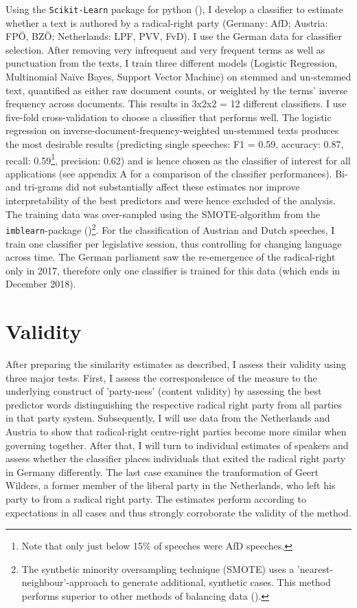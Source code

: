 \documentclass{article}
\begin{document}
Using the \texttt{Scikit-Learn} package for python (\cite{Pedregosa2011}), I develop a classifier to estimate whether a text is authored by a radical-right party (Germany: AfD; Austria: FPÖ, BZÖ; Netherlands: LPF, PVV, FvD). I use the German data for classifier selection. After removing very infrequent and very frequent terms as well as punctuation from the texts, I train three different models (Logistic Regression, Multinomial Naïve Bayes, Support Vector Machine) on stemmed and un-stemmed text, quantified as either raw document counts, or weighted by the terms' inverse frequency across documents. This results in 3x2x2 = 12 different classifiers. I use five-fold cross-validation to choose a classifier that performs well. The logistic regression on inverse-document-frequency-weighted un-stemmed texts produces the most desirable results (predicting single speeches: F1 = 0.59, accuracy: 0.87, recall: 0.59\footnote{Note that only just below 15\% of speeches were AfD speeches.}, precision: 0.62) and is hence chosen as the classifier of interest for all applications (see appendix A for a comparison of the classifier performances). Bi- and tri-grams did not substantially affect these estimates nor improve interpretability of the best predictors and were hence excluded of the analysis. The training data was over-sampled using the SMOTE-algorithm from the \texttt{imblearn}-package (\cite{Lemaitre2017})\footnote{The synthetic minority oversampling technique (SMOTE) uses a 'nearest-neighbour'-approach to generate additional, synthetic cases. This method performs superior to other methods of balancing data (\cite{Chawla2002}).}. For the classification of Austrian and Dutch speeches, I train one classifier per legislative session, thus controlling for changing language across time. The German parliament saw the re-emergence of the radical-right only in 2017, therefore only one classifier is trained for this data (which ends in December 2018). \par


\section{Validity}
After preparing the similarity estimates as described, I assess their validity using three major tests. First, I assess the correspondence of the measure to the underlying construct of 'party-ness' (content validity) by assessing the best predictor words distinguishing the respective radical right party from all parties in that party system. Subsequently, I will use data from the Netherlands and Austria to show that radical-right centre-right parties become more similar when governing together. After that, I will turn to individual estimates of speakers and assess whether the classifier places individuals that exited the radical right party in Germany differently. The last case examines the tranformation of Geert Wilders, a former member of the liberal party in the Netherlands, who left his party to from a radical right party. The estimates perform according to expectations in all cases and thus strongly corroborate the validity of the method.\par
\end{document}

